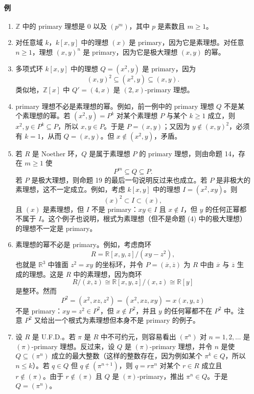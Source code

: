 \paragraph{例}
\begin{enumerate}[label=(\arabic*)]
	\item $\mathbb Z$ 中的 primary 理想是 $0$ 以及 $(p^m)$，其中 $p$ 是素数且 $m\geq1$。
	\item 对任意域 $k$，$k[x,y]$ 中的理想 $(x)$ 是 primary，因为它是素理想。对任意 $n\geq1$，理想 $(x,y)^n$ 是 primary，因为它是极大理想 $(x,y)$ 的幂。
	\item 多项式环 $k[x,y]$ 中的理想 $Q=(x^2,y)$ 是 primary，因为
	\[
	(x,y)^2\subseteq (x^2,y)\subseteq(x,y).
	\]
	类似地，$\mathbb Z[x]$ 中 $Q'=(4,x)$ 是 $(2,x)$-primary 理想。
	\item primary 理想不必是素理想的幂。例如，前一例中的 primary 理想 $Q$ 不是某个素理想的幂。若 $(x^2,y)=P^k$ 对某个素理想 $P$ 与某个 $k\geq1$ 成立，则 $x^2,y\in P^k\subseteq P$，所以 $x,y\in P$。于是 $P=(x,y)$；又因为 $y\notin(x,y)^2$，必须有 $k=1$，从而 $Q=(x,y)$。但 $x\notin(x^2,y)$，矛盾。
	\item 若 $R$ 是 Noether 环，$Q$ 是属于素理想 $P$ 的 primary 理想，则由命题 14，存在 $m\geq1$ 使
	\[
	P^m\subseteq Q\subseteq P.
	\]
	若 $P$ 是极大理想，则命题 19 的最后一句说明反过来也成立。若 $P$ 是非极大的素理想，这不一定成立。例如，考虑 $k[x,y]$ 中的理想 $I=(x^2,xy)$。则
	\[
	(x)^2\subset I\subset (x),
	\]
	且 $(x)$ 是素理想，但 $I$ 不是 primary：$xy\in I$ 且 $x\notin I$，但 $y$ 的任何正幂都不属于 $I$。这个例子也说明，根式为素理想（但不是命题 (4) 中的极大理想）的理想不一定是 primary。
	\item 素理想的幂不必是 primary。例如，考虑商环
	\[
	R=\mathbb R[x,y,z]/(xy-z^2),
	\]
	也就是 $\mathbb R^3$ 中锥面 $z^2=xy$ 的坐标环，并令 $P=(\overline x,\overline z)$ 为 $R$ 中由 $\overline x$ 与 $\overline z$ 生成的理想。这是 $R$ 中的素理想，因为商环
	\[
	R/(\overline x,\overline z)\cong \mathbb R[x,y,z]/(x,z)\cong\mathbb R[y]
	\]
	是整环。然而
	\[
	P^2=(x^2,xz,z^2)=(x^2,xz,xy)=x(x,y,z)
	\]
	不是 primary：$xy=z^2\in P^2$，但 $x\notin P^2$，并且 $y$ 的任何幂都不在 $P^2$ 中。注意 $P^2$ 又给出一个根式为素理想但本身不是 primary 的例子。
	\item 设 $R$ 是 U.F.D.。若 $\pi$ 是 $R$ 中不可约元，则容易看出 $(\pi^n)$ 对 $n=1,2,\ldots$ 是 $(\pi)$-primary 理想。反过来，设 $Q$ 是 $(\pi)$-primary 理想，并令 $n$ 是使 $Q\subseteq(\pi^n)$ 成立的最大整数（这样的整数存在，因为例如某个 $\pi^k\in Q$，所以 $n\leq k$）。若 $q\in Q$ 但 $q\notin(\pi^{n+1})$，则 $q=r\pi^n$ 对某个 $r\in R$ 成立且 $r\notin(\pi)$。由于 $r\notin(\pi)$ 且 $Q$ 是 $(\pi)$-primary，推出 $\pi^n\in Q$。于是 $Q=(\pi^n)$。
\end{enumerate}

